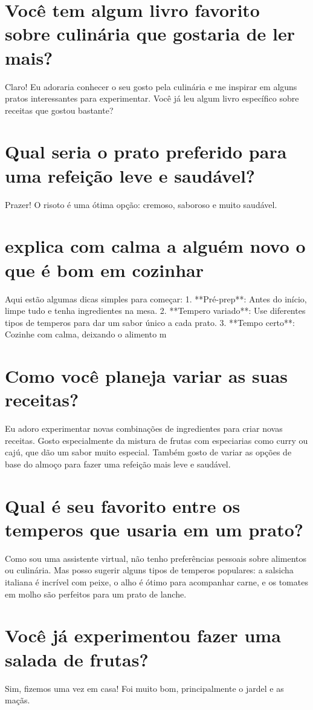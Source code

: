 \documentclass[11pt,a4paper]{article}
\begin{document}
\section{Você tem algum livro favorito sobre culinária que gostaria de ler mais?}
Claro! Eu adoraria conhecer o seu gosto pela culinária e me inspirar em alguns pratos interessantes para experimentar. Você já leu algum livro específico sobre receitas que gostou bastante?

\section{Qual seria o prato preferido para uma refeição leve e saudável?}
Prazer! O risoto é uma ótima opção: cremoso, saboroso e muito saudável.

\section{explica com calma a alguém novo o que é bom em cozinhar}
Aqui estão algumas dicas simples para começar: 1. **Pré-prep**: Antes do início, limpe tudo e tenha ingredientes na mesa. 2. **Tempero variado**: Use diferentes tipos de temperos para dar um sabor único a cada prato. 3. **Tempo certo**: Cozinhe com calma, deixando o alimento m

\section{Como você planeja variar as suas receitas?}
Eu adoro experimentar novas combinações de ingredientes para criar novas receitas. Gosto especialmente da mistura de frutas com especiarias como curry ou cajú, que dão um sabor muito especial. Também gosto de variar as opções de base do almoço para fazer uma refeição mais leve e saudável.

\section{Qual é seu favorito entre os temperos que usaria em um prato?}
Como sou uma assistente virtual, não tenho preferências pessoais sobre alimentos ou culinária. Mas posso sugerir alguns tipos de temperos populares: a salsicha italiana é incrível com peixe, o alho é ótimo para acompanhar carne, e os tomates em molho são perfeitos para um prato de lanche.

\section{Você já experimentou fazer uma salada de frutas?}
Sim, fizemos uma vez em casa! Foi muito bom, principalmente o jardel e as maçãs.
\end{document}
